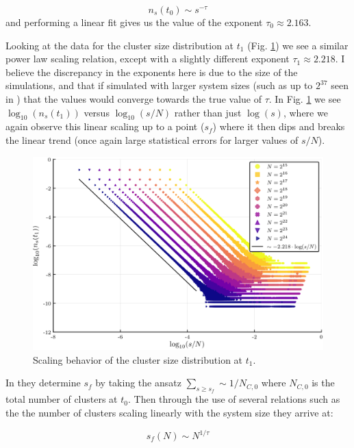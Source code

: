 \begin{equation}
	n_s(t_0) \sim s^{-\tau}
\end{equation}
and performing a linear fit gives us the value of the exponent $\tau_0 \approx 2.163$.

Looking at the data for the cluster size distribution at $t_1$ (Fig. \ref{fig:n_s_t_1}) we see a similar power law scaling relation, except with a slightly different exponent $\tau_1 \approx 2.218$.
I believe the discrepancy in the exponents here is due to the size of the simulations, and that if simulated with larger system sizes (such as up to $2^{37}$ seen in \cite{Lee_1}) that the values would converge towards the true value of $\tau$.
In Fig. \ref{fig:n_s_t_1} we see $\log_{10}(n_s(t_1))$ versus $\log_{10}(s/N)$ rather than just $\log(s)$, where we again observe this linear scaling up to a point ($s_f$) where it then dips and breaks the linear trend (once again large statistical errors for larger values of $s/N$).

\begin{figure}[H]
	\centering
	\includegraphics[width=350pt, clip]{images/n_s_t_1.png}
	\caption{Scaling behavior of the cluster size distribution at $t_1$.}
	\label{fig:n_s_t_1}
\end{figure}

In \cite{Lee_1} they determine $s_f$ by taking the ansatz $\sum_{s \ge s_f} \sim 1 / N_{C, 0}$ where $N_{C, 0}$ is the total number of clusters at $t_0$.
Then through the use of several relations such as the the number of clusters scaling linearly with the system size they arrive at:

\begin{equation}
	s_f(N) \sim N^{1 / \tau}
\end{equation}

